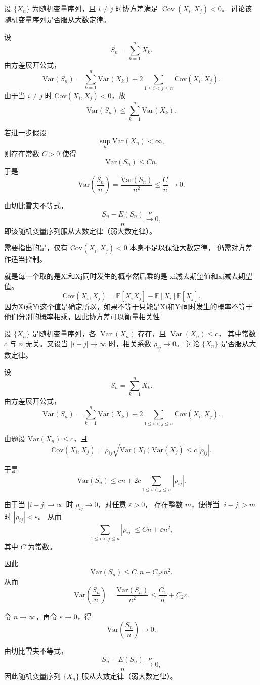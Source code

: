 \begin{homework}[5.8]
设 $\{X_n\}$ 为随机变量序列，且 $i\ne j$ 时协方差满足 $\operatorname{Cov}(X_i,X_j)<0$。
讨论该随机变量序列是否服从大数定律。
\end{homework}
\begin{solution}
设
\[
S_n=\sum_{k=1}^n X_k.
\]
由方差展开公式，
\[
\mathrm{Var}(S_n)
=\sum_{k=1}^n \mathrm{Var}(X_k)
+2\sum_{1\le i<j\le n}\mathrm{Cov}(X_i,X_j).
\]
由于当 $i\neq j$ 时 $\mathrm{Cov}(X_i,X_j)<0$，故
\[
\mathrm{Var}(S_n)
\le \sum_{k=1}^n \mathrm{Var}(X_k).
\]

若进一步假设
\[
\sup_{n}\mathrm{Var}(X_n)<\infty,
\]
则存在常数 $C>0$ 使得
\[
\mathrm{Var}(S_n)\le Cn.
\]
于是
\[
\mathrm{Var}\!\left(\frac{S_n}{n}\right)
=\frac{\mathrm{Var}(S_n)}{n^2}
\le \frac{C}{n}\to 0.
\]

由切比雪夫不等式，
\[
\frac{S_n-E(S_n)}{n}\xrightarrow{P}0,
\]
即该随机变量序列服从大数定律（弱大数定律）。

\medskip
\noindent
需要指出的是，仅有 $\mathrm{Cov}(X_i,X_j)<0$ 本身不足以保证大数定律，
仍需对方差作适当控制。
\end{solution}
\begin{dxtips}[协方差的理解]
    就是每一个取的是Xi和Xj同时发生的概率然后乘的是 xi减去期望值和xj减去期望值。
    \[
\mathrm{Cov}(X_i, X_j)
=
\mathbb E[X_i X_j]
-
\mathbb E[X_i]\mathbb E[X_j].
\]
因为Xi乘Yi这个值是确定所以，如果不等于只能是Xi和Yi同时发生的概率不等于他们分别的概率相乘，因此协方差可以衡量相关性
\end{dxtips}
\begin{homework}[5.9]
设 $\{X_n\}$ 是随机变量序列，各 $\operatorname{Var}(X_n)$ 存在，且 $\operatorname{Var}(X_n)\le c$，
其中常数 $c$ 与 $n$ 无关。又设当 $|i-j|\to\infty$ 时，相关系数 $\rho_{ij}\to 0$。
讨论 $\{X_n\}$ 是否服从大数定律。
\end{homework}
\begin{solution}
设
\[
S_n=\sum_{k=1}^n X_k.
\]
由方差展开公式，
\[
\mathrm{Var}(S_n)
=\sum_{k=1}^n \mathrm{Var}(X_k)
+2\sum_{1\le i<j\le n}\mathrm{Cov}(X_i,X_j).
\]

由题设 $\mathrm{Var}(X_n)\le c$，且
\[
\mathrm{Cov}(X_i,X_j)
=\rho_{ij}\sqrt{\mathrm{Var}(X_i)\mathrm{Var}(X_j)}
\le c\,|\rho_{ij}|.
\]

于是
\[
\mathrm{Var}(S_n)
\le cn + 2c\sum_{1\le i<j\le n} |\rho_{ij}|.
\]

由于当 $|i-j|\to\infty$ 时 $\rho_{ij}\to 0$，对任意 $\varepsilon>0$，
存在整数 $m$，使得当 $|i-j|>m$ 时 $|\rho_{ij}|<\varepsilon$。
从而
\[
\sum_{1\le i<j\le n} |\rho_{ij}|
\le Cn + \varepsilon n^2,
\]
其中 $C$ 为常数。

因此
\[
\mathrm{Var}(S_n)\le C_1 n + C_2 \varepsilon n^2.
\]
从而
\[
\mathrm{Var}\!\left(\frac{S_n}{n}\right)
=\frac{\mathrm{Var}(S_n)}{n^2}
\le \frac{C_1}{n}+C_2\varepsilon.
\]

令 $n\to\infty$，再令 $\varepsilon\to 0$，得
\[
\mathrm{Var}\!\left(\frac{S_n}{n}\right)\to 0.
\]

由切比雪夫不等式，
\[
\frac{S_n-E(S_n)}{n}\xrightarrow{P}0,
\]
因此随机变量序列 $\{X_n\}$ 服从大数定律（弱大数定律）。
\end{solution}
